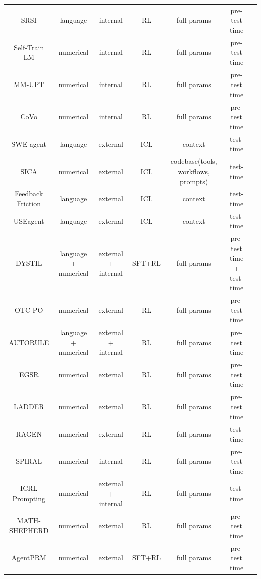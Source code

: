\begin{table}[!t]
{\begin{tabular}{ccccccc}
SRSI\citep{simonds2025selfrewardingselfimproving} & language & internal & RL & full params & pre-test time \\
Self-Train LM\citep{shafayat2025largereasoningmodelsselftrain} & numerical & internal & RL & full params & pre-test time \\
MM-UPT\citep{wei2025unsupervisedposttrainingmultimodalllm} & numerical & internal & RL & full params & pre-test time \\
CoVo\citep{zhang2025consistentpathsleadtruth} & numerical & internal & RL & full params & pre-test time \\
SWE-agent\citep{du2025swedevevaluatingtrainingautonomous} & language & external & ICL & context & test-time \\
SICA\citep{robeyns2025self} & numerical & external & ICL & codebase(tools, workflows, prompts) & test-time \\
Feedback Friction\citep{jiang2025feedbackfriction} & language & external & ICL & context & test-time \\
USEagent\citep{applis2025useagent} & language & external & ICL & context & test-time \\
DYSTIL\citep{wang2025dystildynamicstrategyinduction} & language + numerical & external + internal & SFT+RL & full params & pre-test time + test-time \\
OTC-PO\citep{wang2025otcpo} & numerical & external & RL & full params & pre-test time \\
AUTORULE\citep{wang2025autorule} & language + numerical & external + internal & RL & full params & pre-test time \\
EGSR\citep{zhang2025learning} & numerical & external  & RL & full params & pre-test time \\
LADDER\citep{simonds2025ladder} & numerical & external  & RL & full params & pre-test time \\
RAGEN\citep{wang2025ragen} & numerical & external & RL & full params & test-time \\
SPIRAL\citep{liu2025spiral} & numerical & internal & RL & full params & pre-test time \\
ICRL Prompting\citep{song2025reward} & numerical & external + internal & RL & full params & test-time \\
MATH-SHEPHERD\citep{wang2023math} & numerical & external & RL & full params & pre-test time \\
AgentPRM\citep{choudhury2025process} & numerical & external & SFT+RL & full params & pre-test time \\

\end{tabular}}
\end{table}
